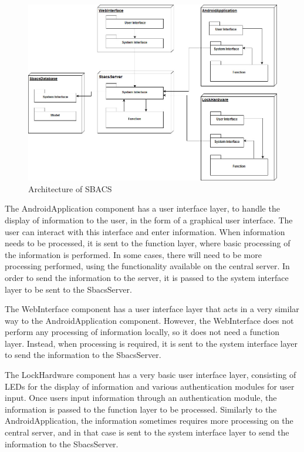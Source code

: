 \documentclass[12pt]{report}
\begin{document}
\begin{figure}
    \centering
    \includegraphics[width=\textwidth]{Diagrams/ArchitectureSBACS}
    \caption{Architecture of SBACS}
    \label{fig:architecture-sbacs}
\end{figure}

The AndroidApplication component has a user interface layer, to handle the display of information to the user,
in the form of a graphical user interface. The user can interact with this interface and enter information.
When information needs to be processed, it is sent to the function layer, where basic processing of the
information is performed. In some cases, there will need to be more processing performed, using the functionality
available on the central server. In order to send the information to the server, it is passed to the system
interface layer to be sent to the SbacsServer.

The WebInterface component has a user interface layer that acts in a very similar way to the AndroidApplication
component. However, the WebInterface does not perform any processing of information locally, so it does not
need a function layer. Instead, when processing is required, it is sent to the system interface layer to send
the information to the SbacsServer.

The LockHardware component has a very basic user interface layer, consisting of LEDs for the display of information
and various authentication modules for user input. Once users input information through an authentication module,
the information is passed to the function layer to be processed. Similarly to the AndroidApplication, the information
sometimes requires more processing on the central server, and in that case is sent to the system interface layer
to send the information to the SbacsServer.
\end{document}

